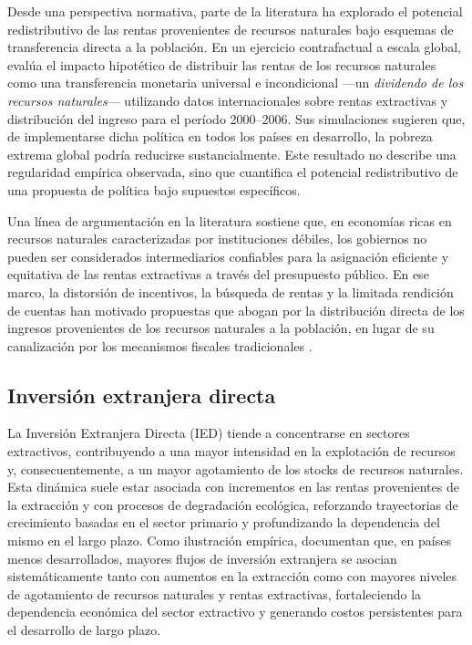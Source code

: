 \documentclass[../../TFM.tex]{subfiles}
\begin{document}
	Desde una perspectiva normativa, parte de la literatura ha explorado el potencial redistributivo de las rentas provenientes de recursos naturales bajo esquemas de transferencia directa a la población. En un ejercicio contrafactual a escala global, \textcite{Segal2011} evalúa el impacto hipotético de distribuir las rentas de los recursos naturales como una transferencia monetaria universal e incondicional —un \textit{dividendo de los recursos naturales}— utilizando datos internacionales sobre rentas extractivas y distribución del ingreso para el período 2000–2006. Sus simulaciones sugieren que, de implementarse dicha política en todos los países en desarrollo, la pobreza extrema global podría reducirse sustancialmente. Este resultado no describe una regularidad empírica observada, sino que cuantifica el potencial redistributivo de una propuesta de política bajo supuestos específicos.
	
	Una línea de argumentación en la literatura sostiene que, en economías ricas en recursos naturales caracterizadas por instituciones débiles, los gobiernos no pueden ser considerados intermediarios confiables para la asignación eficiente y equitativa de las rentas extractivas a través del presupuesto público. En ese marco, la distorsión de incentivos, la búsqueda de rentas y la limitada rendición de cuentas han motivado propuestas que abogan por la distribución directa de los ingresos provenientes de los recursos naturales a la población, en lugar de su canalización por los mecanismos fiscales tradicionales \parencite{Gupta2014}.
	
	\subsection{Inversión extranjera directa}
	\label{subsec:IED}
	
	La Inversión Extranjera Directa (IED) tiende a concentrarse en sectores extractivos, contribuyendo a una mayor intensidad en la explotación de recursos y, consecuentemente, a un mayor agotamiento de los stocks de recursos naturales. Esta dinámica suele estar asociada con incrementos en las rentas provenientes de la extracción y con procesos de degradación ecológica, reforzando trayectorias de crecimiento basadas en el sector primario y profundizando la dependencia del mismo en el largo plazo. Como ilustración empírica, \textcite{Long2017} documentan que, en países menos desarrollados, mayores flujos de inversión extranjera se asocian sistemáticamente tanto con aumentos en la extracción como con mayores niveles de agotamiento de recursos naturales y rentas extractivas, fortaleciendo la dependencia económica del sector extractivo y generando costos persistentes para el desarrollo de largo plazo.
	
\end{document}
